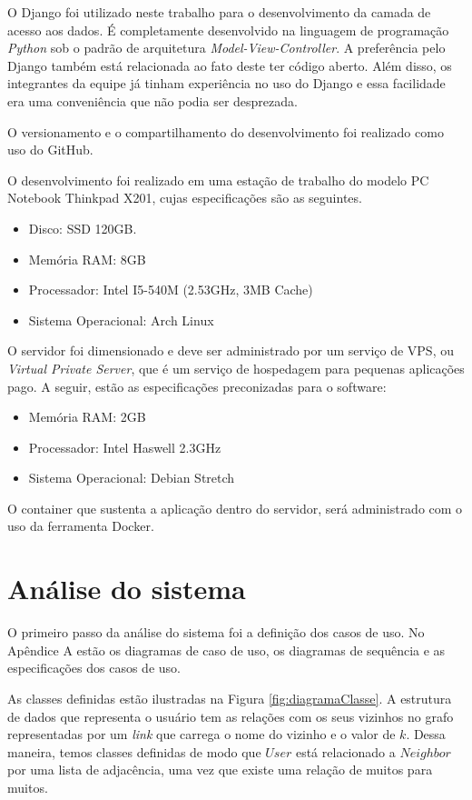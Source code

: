 O Django foi utilizado neste trabalho para o desenvolvimento da camada de acesso aos dados. É completamente desenvolvido na linguagem de programação \emph{Python} sob o padrão de arquitetura \emph{Model-View-Controller}. A preferência pelo Django também está relacionada ao fato deste ter código aberto. Além disso, os integrantes da equipe já tinham experiência no uso do Django e essa facilidade era uma conveniência que não podia ser desprezada.

O versionamento e o compartilhamento do desenvolvimento foi realizado como uso do GitHub.

O desenvolvimento foi realizado em uma estação de trabalho do modelo PC Notebook Thinkpad X201, cujas especificações são as seguintes.

\begin{itemize}
\item Disco: SSD 120GB.
\item Memória RAM: 8GB
\item Processador: Intel I5-540M (2.53GHz, 3MB Cache)
\item Sistema Operacional: Arch Linux
\end{itemize}
 
O servidor foi dimensionado e deve ser administrado por um serviço de VPS, ou \emph{Virtual Private Server}, que é um serviço de hospedagem para pequenas aplicações pago. A seguir, estão as especificações preconizadas para o software:

\begin{itemize}
\item Memória RAM: 2GB
\item Processador: Intel Haswell 2.3GHz
\item Sistema Operacional: Debian Stretch
\end{itemize}

O container que sustenta a aplicação dentro do servidor, será administrado com o uso da ferramenta Docker.

\section{Análise do sistema}

O primeiro passo da análise do sistema foi a definição dos casos de uso. No Apêndice A estão os diagramas de caso de uso, os diagramas de sequência e as especificações dos casos de uso.

As classes definidas estão ilustradas na Figura \ref{fig:diagramaClasse}. A estrutura de dados que representa o usuário tem as relações com os seus vizinhos no grafo representadas por um \emph{link} que carrega o nome do vizinho e o valor de $k$. Dessa maneira, temos classes definidas de modo que $User$ está relacionado a $Neighbor$ por uma lista de adjacência, uma vez que existe uma relação de muitos para muitos.

